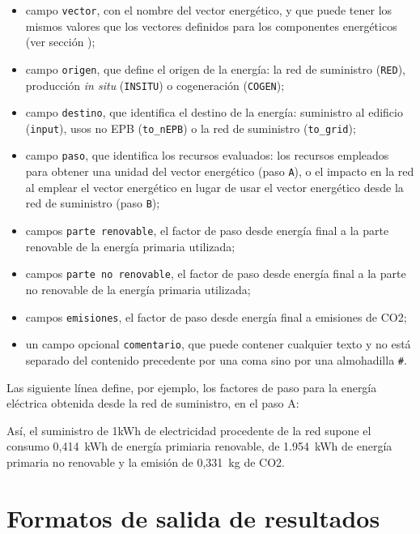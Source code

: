 \documentclass[10pt,notitlepage,oneside,a4paper]{article}
\begin{document}
\begin{itemize}
    \item campo \texttt{vector}, con el nombre del vector energético, y que puede tener los mismos valores que los vectores definidos para los componentes energéticos (ver sección );
    \item campo \texttt{origen}, que define el origen de la energía: la red de suministro (\texttt{RED}), producción \textit{in situ} (\texttt{INSITU}) o cogeneración (\texttt{COGEN});
    \item campo \texttt{destino}, que identifica el destino de la energía: suministro al edificio (\texttt{input}), usos no EPB (\texttt{to\_nEPB}) o la red de suministro (\texttt{to\_grid});
    \item campo \texttt{paso}, que identifica los recursos evaluados: los recursos empleados para obtener una unidad del vector energético (paso \texttt{A}), o el impacto en la red al emplear el vector energético en lugar de usar el vector energético desde la red de suministro (paso \texttt{B});
    \item campos \texttt{parte renovable}, el factor de paso desde energía final a la parte renovable de la energía primaria utilizada;
    \item campos \texttt{parte no renovable}, el factor de paso desde energía final a la parte no renovable de la energía primaria utilizada;
    \item campos \texttt{emisiones}, el factor de paso desde energía final a emisiones de CO2;
    \item un campo opcional \texttt{comentario}, que puede contener cualquier texto y no está separado del contenido precedente por una coma sino por una almohadilla \texttt{\#}.
\end{itemize}

Las siguiente línea define, por ejemplo,  los factores de paso para la energía eléctrica obtenida desde la red de suministro, en el paso A:



Así, el suministro de 1kWh de electricidad procedente de la red supone el consumo 0,414~kWh de energía primiaria renovable, de 1.954~kWh de energía primaria no renovable y la emisión de 0,331~kg de CO2.

\clearpage
\newpage
\section{Formatos de salida de resultados}\label{sec:formatosalida}
\end{document}
